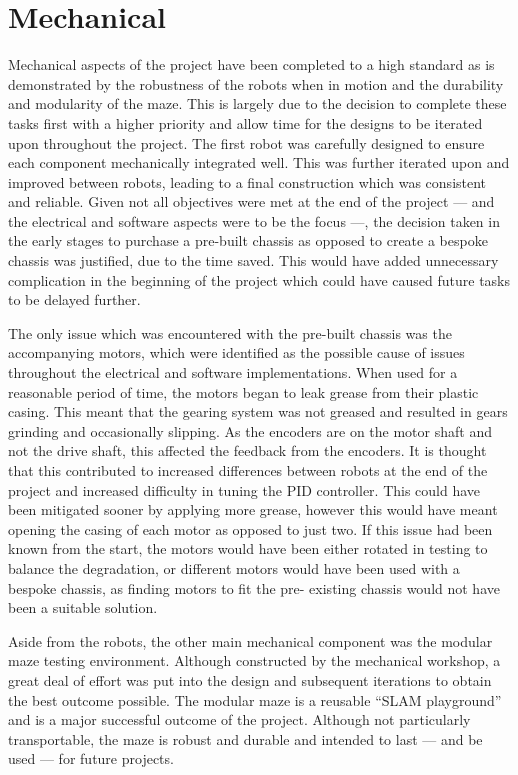 \section{Mechanical}\label{eval/mech} 
Mechanical aspects of the project have been completed to a 
high standard as is demonstrated by the robustness of the robots when in 
motion and the durability and modularity of the maze. This is largely due to the 
decision to complete these tasks first with a higher priority and allow time for the 
designs to be iterated upon throughout the project. The first robot was carefully 
designed to ensure each component mechanically integrated well. This was further 
iterated upon and improved between robots, leading to a final construction which was 
consistent and reliable. Given not all objectives were met at the end of the project 
--- and the electrical and software aspects were to be the focus ---, the decision taken in the 
early stages to purchase a pre-built chassis as opposed to create a bespoke chassis 
was justified, due to the time saved. This would have added unnecessary complication 
in the beginning of the project which could have caused future 
tasks to be delayed further. 

The only issue which was encountered with the pre-built chassis was the 
accompanying motors, which were identified as the possible cause of 
issues throughout the electrical and software implementations. When used 
for a reasonable period of time, the motors began to leak grease from 
their plastic casing. This meant that the gearing system was not greased 
and resulted in gears grinding and occasionally slipping. As the 
encoders are on the motor shaft and not the drive shaft, this affected 
the feedback from the encoders. It is thought that this contributed to 
increased differences between robots at the end of the project and 
increased difficulty in tuning the PID controller. This could have been 
mitigated sooner by applying more grease, however this would have meant 
opening the casing of each motor as opposed to just two. If this issue 
had been known from the start, the motors would have been either rotated 
in testing to balance the degradation, or different motors would have 
been used with a bespoke chassis, as finding motors to fit the pre-
existing chassis would not have been a suitable solution. 


Aside from the robots, the other main mechanical component was the modular maze 
testing environment. Although constructed by the mechanical workshop, a great deal of 
effort was put into the design and subsequent iterations to obtain the best outcome 
possible. The modular maze is a reusable ``SLAM playground'' and is a major 
successful outcome of the project. Although not particularly transportable, the maze 
is robust and durable and intended to last --- and be used --- for future projects.

